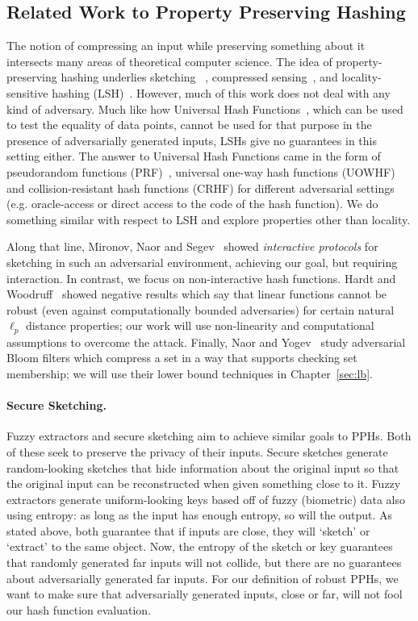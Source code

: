 \subsection{Related Work to Property Preserving Hashing}
The notion of compressing an input while preserving something about it intersects many areas of theoretical computer science. The idea of property-preserving hashing underlies sketching ~\cite{MunroP80,DBLP:journals/scp/MisraG82,AlonMS96,CormodeM05,CharikarCF04}, compressed sensing~\cite{ChenDS01}, and locality-sensitive hashing (LSH)~\cite{IndykM98}. However, much of this work does not deal with any kind of adversary. Much like how Universal Hash Functions~\cite{CarterW77}, which can be used to test the equality of data points, cannot be used for that purpose in the presence of adversarially generated inputs, LSHs give no guarantees in this setting either. The answer to Universal Hash Functions came in the form of pseudorandom functions (PRF)~\cite{GoldreichGM86}, universal one-way hash functions (UOWHF)~\cite{NaorY89} and collision-resistant hash functions (CRHF) for different adversarial settings (e.g. oracle-access or direct access to the code of the hash function). We do something similar with respect to LSH and explore properties other than locality.

Along that line, Mironov, Naor and Segev~\cite{MNS08} showed {\em interactive protocols} for sketching in such an adversarial environment, achieving our goal, but requiring interaction. In contrast, we focus on non-interactive hash functions. Hardt and Woodruff~\cite{HW13} showed negative results which say that linear functions cannot be robust (even against computationally bounded adversaries) for certain natural $\ell_p$ distance properties; our work will use non-linearity and computational assumptions to overcome the \cite{HW13} attack. Finally, Naor and Yogev~\cite{NY15} study adversarial Bloom filters which compress a set in a way that supports checking set membership; we will use their lower bound techniques in Chapter~\ref{sec:lb}.

\paragraph{Secure Sketching.}
Fuzzy extractors and secure sketching \cite{DORS08} aim to achieve similar goals to PPHs. Both of these seek to preserve the privacy of their inputs. Secure sketches generate random-looking sketches that hide information about the original input so that the original input can be reconstructed when given something close to it. Fuzzy extractors generate uniform-looking keys based off of fuzzy (biometric) data also using entropy: as long as the input has enough entropy, so will the output. As stated above, both guarantee that if inputs are close, they will `sketch' or `extract' to the same object. Now, the entropy of the sketch or key guarantees that randomly generated far inputs will not collide, but there are no guarantees about adversarially generated far inputs. For our definition of robust PPHs, we want to make sure that adversarially generated inputs, close or far, will not fool our hash function evaluation.

